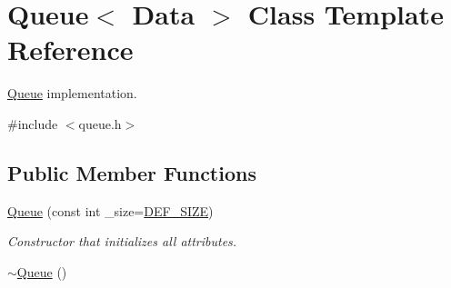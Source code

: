\hypertarget{classQueue}{}\section{Queue$<$ Data $>$ Class Template Reference}
\label{classQueue}


\hyperlink{classQueue}{Queue} implementation.  




{\ttfamily \#include $<$queue.\+h$>$}

\subsection*{Public Member Functions}
\begin{DoxyCompactItemize}
\item 
\hyperlink{classQueue_aa26fae5040939122227f2e2e67db9f13}{Queue} (const int \+\_\+size=\hyperlink{classQueue_ab432905ef6ae1f07d06adbecec4176b7}{D\+E\+F\+\_\+\+S\+I\+ZE})\hypertarget{classQueue_aa26fae5040939122227f2e2e67db9f13}{}\label{classQueue_aa26fae5040939122227f2e2e67db9f13}

\begin{DoxyCompactList}\small\item\em Constructor that initializes all attributes. \end{DoxyCompactList}\item 
\hyperlink{classQueue_aab7039eecb4b8a19bad375788911a9ec}{$\sim$\+Queue} ()\hypertarget{classQueue_aab7039eecb4b8a19bad375788911a9ec}{}\label{classQueue_aab7039eecb4b8a19bad375788911a9ec}


\end{DoxyCompactItemize}
